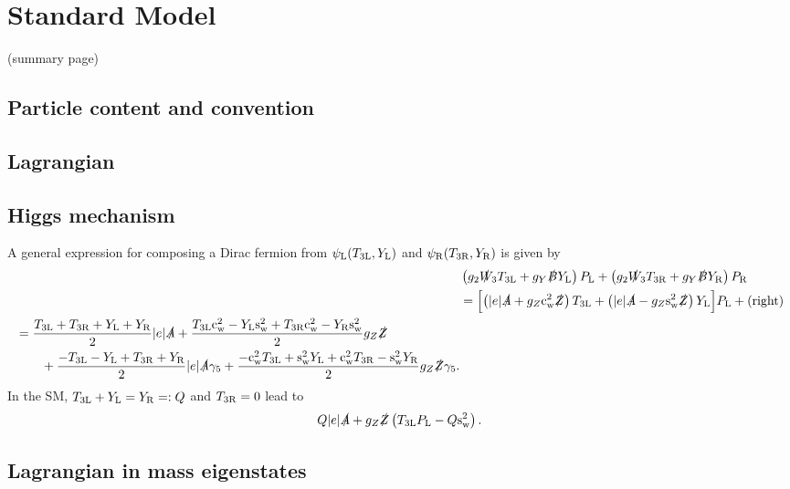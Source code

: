 \documentclass[CheatSheet]{subfiles}
\begin{document}
\summarystyle
\section{Standard Model}
(summary page)

\newpage
\detailstyle

\subsection{Particle content and convention}
\subsection{Lagrangian}
\subsection{Higgs mechanism}

A general expression for composing a Dirac fermion from $\psi_{\mathrm{L}}(T_{\mathrm{3L}}, Y_{\mathrm{L}})$ and $\psi_{\mathrm{R}}(T_{\mathrm{3R}}, Y_{\mathrm{R}})$ is given by
\begin{align}
& \left(
  {g_2} \slashedW[_3] T\w{3L}
 +{g_Y} \slashed{B} Y\w{L}\right)\PL
 + \left(
  {g_2} \slashedW[_3] T\w{3R}
 +{g_Y} \slashed{B} Y\w{R}\right)\PR\\
&=\Bigl[
  \left(|e|\slashed A+g_Z\cw^2\slashed Z\right) T\w{3L}
 +\left(|e|\slashed A-g_Z\sw^2\slashed Z\right) Y\w {L}\Bigr]\PL
 + \text{(right)}\\
\begin{split}
&=
   \frac{T\w{3L}+T\w{3R}+Y\w L+Y\w R}{2}
  |e|\slashed A
  +\frac{T\w{3L}\cw^2 - Y\w {L}\sw^2 + T\w{3R}\cw^2 - Y\w {R}\sw^2}{2}
  g_Z\slashed Z\\
&\qquad
 +\frac{- T\w{3L} - Y\w {L} + T\w{3R} + Y\w {R}}2
 |e|\slashed A\gamma_5
 +\frac{ -\cw^2 T\w{3L} +\sw^2 Y\w {L} +\cw^2 T\w{3R} -\sw^2 Y\w {R}}{2}
 g_Z \slashed Z\gamma_5.
\end{split}
\end{align}
In the SM, $T_{\mathrm{3L}}+Y_{\mathrm{L}}=Y_{\mathrm{R}}=:Q$ and $T_{\mathrm{3R}}=0$ lead to
\begin{equation}
   Q |e|\slashed A
  +g_Z\slashed Z \left(T_{\mathrm{3L}}P_{\mathrm{L}} - Q\mathrm{s}_{\mathrm w}^2\right).
\end{equation}
\subsection{Lagrangian in mass eigenstates}

\clearpage
\end{document}
